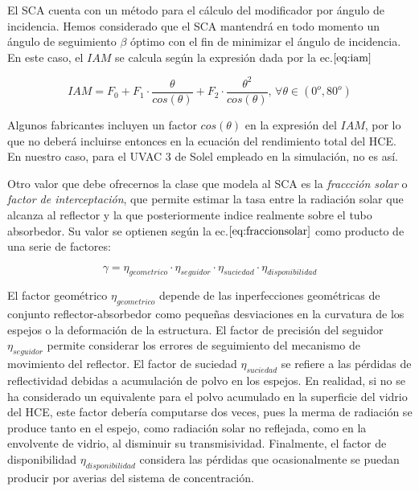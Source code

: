El SCA cuenta con un método para el cálculo del modificador por ángulo
de incidencia. Hemos considerado que el SCA mantendrá en todo momento un
ángulo de seguimiento \(\beta\) óptimo con el fin de minimizar el ángulo
de incidencia. En este caso, el \(IAM\) se calcula según la expresión
dada por la ec.\(\eqref{eq:iam}\)

\begin{equation}
   IAM = F_0 + F_1 \cdot \frac{\theta}{cos(\theta)} + F_2 \cdot \frac{\theta^2}{cos(\theta)},\, \forall   
 \theta \in (0^o, 80^o)
    \label{eq:iam}
\end{equation}

Algunos fabricantes incluyen un factor \(cos(\theta)\) en la expresión
del \(IAM\), por lo que no deberá incluirse entonces en la ecuación del
rendimiento total del HCE. En nuestro caso, para el UVAC 3 de Solel
empleado en la simulación, no es así.

Otro valor que debe ofrecernos la clase que modela al SCA es la
\emph{fraccción solar} o \emph{factor de interceptación}, que permite
estimar la tasa entre la radiación solar que alcanza al reflector y la
que posteriormente indice realmente sobre el tubo absorbedor. Su valor
se optienen según la ec.\(\eqref{eq:fraccionsolar}\) como producto de
una serie de factores:

\begin{equation}
   \gamma = \eta_{geometrico} \cdot \eta_{seguidor} \cdot \eta_{suciedad} \cdot \eta_{disponibilidad}
    \label{eq:fraccionsolar}
\end{equation}

El factor geométrico \(\eta_{geometrico}\) depende de las inperfecciones
geométricas de conjunto reflector-absorbedor como pequeñas desviaciones
en la curvatura de los espejos o la deformación de la estructura. El
factor de precisión del seguidor \(\eta_{seguidor}\) permite considerar
los errores de seguimiento del mecanismo de movimiento del reflector. El
factor de suciedad \(\eta_{suciedad}\) se refiere a las pérdidas de
reflectividad debidas a acumulación de polvo en los espejos. En
realidad, si no se ha considerado un equivalente para el polvo acumulado
en la superficie del vidrio del HCE, este factor debería computarse dos
veces, pues la merma de radiación se produce tanto en el espejo, como
radiación solar no reflejada, como en la envolvente de vidrio, al
disminuir su transmisividad. Finalmente, el factor de disponibilidad
\(\eta_{disponibilidad}\) considera las pérdidas que ocasionalmente se
puedan producir por averias del sistema de concentración.

